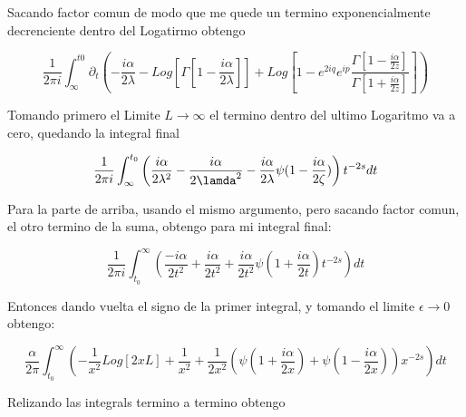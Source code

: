 Sacando factor comun de modo que me quede un termino exponencialmente decrenciente dentro del Logatirmo obtengo

\begin{equation}
\frac{1}{2 \pi i}  \int _{\infty} ^{t0} 
\partial _t
\left(
-\frac{i\alpha}{2 \lambda} - Log[\Gamma[1- \frac{i \alpha}{2 \lambda}]] +
Log[1- e ^{2 i q} e ^{i p} \frac{ \Gamma[1-\frac{i \alpha}{2 z }]}{ \Gamma[1+\frac{i \alpha}{2 z }]} ]
\right)
\end{equation}


Tomando primero el Limite $L \rightarrow \infty $ el termino dentro del ultimo Logaritmo va a cero, quedando la integral final 

\begin{equation}
\frac{1}{2 \pi i} \int _{\infty} ^{t_0} 
\left(
\frac{i \alpha}{2 \lambda ^2} -
\frac{i \alpha}{2\lamda ^2} -
\frac{i \alpha}{2 \lambda } \psi (1 - \frac{i \alpha}{2 \zeta}) 
\right)
t ^{-2s} dt
\end{equation}

Para la parte de arriba, usando el mismo argumento, pero sacando factor comun, el otro termino de la suma, obtengo para mi integral final:

\begin{equation}
\frac{1}{2 \pi i} \int _{t_0} ^{\infty}
\left(
\frac{- i \alpha}{2 t^2} + 
\frac{i \alpha}{2 t^2} +
\frac{i \alpha}{2 t^2} \psi (1+\frac{i \alpha}{2 t}) 
t ^{-2s} 
\right)
dt
\end{equation}

Entonces dando vuelta el signo de la primer integral, y tomando el limite $\epsilon \rightarrow 0$ obtengo:

\begin{equation}
\frac{\alpha}{2 \pi } \int _{t_0} ^{\infty}
\left(
- \frac{1}{x ^2} Log[2 x L ] +
\frac{1}{ x^2} +
\frac{1}{ 2 x^2} ( \psi (1+ \frac{i \alpha}{2 x}) + \psi (1 - \frac{i \alpha}{2 x}))
x ^{-2s}
\right)
dt
\end{equation}

Relizando las integrals termino a termino obtengo
















